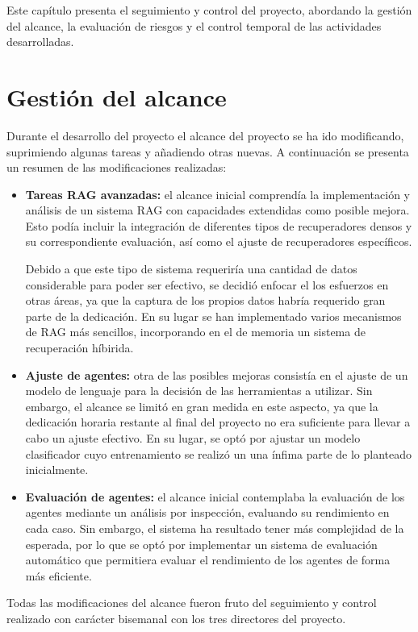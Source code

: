 Este capítulo presenta el seguimiento y control del proyecto, abordando la gestión del alcance, la evaluación de riesgos y el control temporal de las actividades desarrolladas.

\section{Gestión del alcance}
Durante el desarrollo del proyecto el alcance del proyecto se ha ido modificando, suprimiendo algunas tareas y añadiendo otras nuevas. A continuación se presenta un resumen de las modificaciones realizadas:

\begin{itemize}
  \item\textbf{Tareas RAG avanzadas: }el alcance inicial comprendía la implementación y análisis de un sistema RAG con capacidades extendidas como posible mejora. Esto podía incluir la integración de diferentes tipos de recuperadores densos y su correspondiente evaluación, así como el ajuste de recuperadores específicos. 

Debido a que este tipo de sistema requeriría una cantidad de datos considerable para poder ser efectivo, se decidió enfocar el los esfuerzos en otras áreas, ya que la captura de los propios datos habría requerido gran parte de la dedicación. En su lugar se han implementado varios mecanismos de RAG más sencillos, incorporando en el de memoria un sistema de recuperación híbirida. 
  \item\textbf{Ajuste de agentes: }otra de las posibles mejoras consistía en el ajuste de un modelo de lenguaje para la decisión de las herramientas a utilizar. Sin embargo, el alcance se limitó en gran medida en este aspecto, ya que la dedicación horaria restante al final del proyecto no era suficiente para llevar a cabo un ajuste efectivo. En su lugar, se optó por ajustar un modelo clasificador cuyo entrenamiento se realizó un una ínfima parte de lo planteado inicialmente.
  \item\textbf{Evaluación de agentes: }el alcance inicial contemplaba la evaluación de los agentes mediante un análisis por inspección, evaluando su rendimiento en cada caso. Sin embargo, el sistema ha resultado tener más complejidad de la esperada, por lo que se optó por implementar un sistema de evaluación automático que permitiera evaluar el rendimiento de los agentes de forma más eficiente.
\end{itemize}

Todas las modificaciones del alcance fueron fruto del seguimiento y control realizado con carácter bisemanal con los tres directores del proyecto. 

